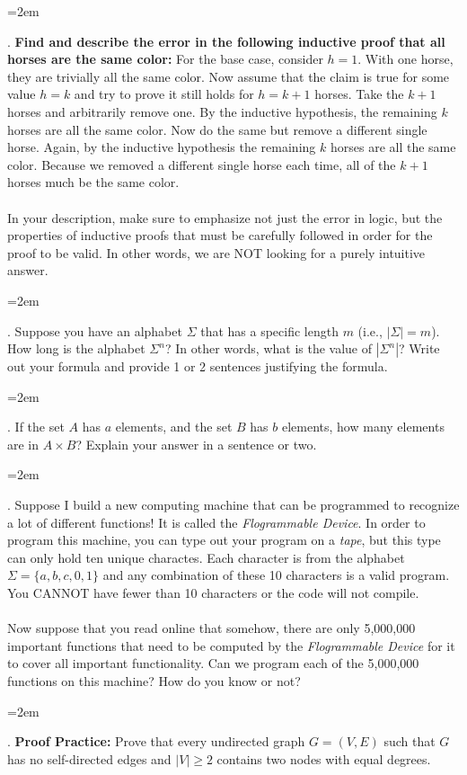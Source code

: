 \documentclass[12pt]{article}
\newcounter{quesnum}
\newcommand{\question}[2][??]{
\begin{list}{\labelitemi}{\leftmargin=2em}
\item [\arabic{quesnum}.] {} {#2}
\end{list}
\addtocounter{quesnum}{1}
}
\begin{document}
\question[3]{
\textbf{Find and describe the error in the following inductive proof that all horses are the same color:} For the base case, consider $h=1$. With one horse, they are trivially all the same color. Now assume that the claim is true for some value $h=k$ and try to prove it still holds for $h=k+1$ horses. Take the $k+1$ horses and arbitrarily remove one. By the inductive hypothesis, the remaining $k$ horses are all the same color. Now do the same but remove a different single horse. Again, by the inductive hypothesis the remaining $k$ horses are all the same color. Because we removed a different single horse each time, all of the $k+1$ horses much be the same color.\\
\\
In your description, make sure to emphasize not just the error in logic, but the properties of inductive proofs that must be carefully followed in order for the proof to be valid. In other words, we are NOT looking for a purely intuitive answer.}

\vspace{12pt}


\question[3]{
Suppose you have an alphabet $\Sigma$ that has a specific length $m$ (i.e., $|\Sigma|=m$). How long is the alphabet $\Sigma^n$? In other words, what is the value of $|\Sigma^n|$? Write out your formula and provide 1 or 2 sentences justifying the formula.
}

\vspace{12pt}

\question[3]{
If the set $A$ has $a$ elements, and the set $B$ has $b$ elements, how many elements are in $A \times B$? Explain your answer in a sentence or two.
}

\vspace{12pt}




\question[3]{
Suppose I build a new computing machine that can be programmed to recognize a lot of different functions! It is called the \emph{Flogrammable Device}. In order to program this machine, you can type out your program on a \emph{tape}, but this type can only hold ten unique charactes. Each character is from the alphabet $\Sigma=\{a,b,c,0,1\}$ and any combination of these 10 characters is a valid program. You CANNOT have fewer than 10 characters or the code will not compile.\\
\\
Now suppose that you read online that somehow, there are only 5,000,000 important functions that need to be computed by the \emph{Flogrammable Device} for it to cover all important functionality. Can we program each of the 5,000,000 functions on this machine? How do you know or not?
}

\vspace{12pt}

\question[3]{
\textbf{Proof Practice:} Prove that every undirected graph $G = (V,E)$ such that $G$ has no self-directed edges and $|V| \geq 2$ contains two nodes with equal degrees.
}
\end{document}
